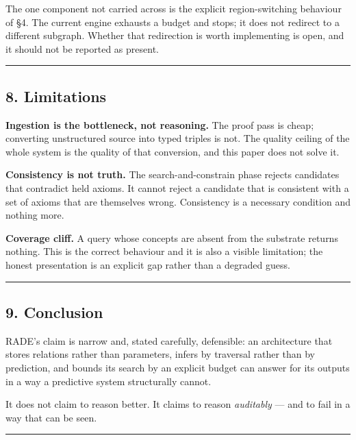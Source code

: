 \documentclass[
  11pt,
  a4paper,
]{article}
\begin{document}
The one component not carried across is the explicit region-switching
behaviour of §4. The current engine exhausts a budget and stops; it does
not redirect to a different subgraph. Whether that redirection is worth
implementing is open, and it should not be reported as present.

\begin{center}\rule{0.5\linewidth}{0.5pt}\end{center}

\subsection{8. Limitations}\label{limitations}

\textbf{Ingestion is the bottleneck, not reasoning.} The proof pass is
cheap; converting unstructured source into typed triples is not. The
quality ceiling of the whole system is the quality of that conversion,
and this paper does not solve it.

\textbf{Consistency is not truth.} The search-and-constrain phase
rejects candidates that contradict held axioms. It cannot reject a
candidate that is consistent with a set of axioms that are themselves
wrong. Consistency is a necessary condition and nothing more.

\textbf{Coverage cliff.} A query whose concepts are absent from the
substrate returns nothing. This is the correct behaviour and it is also
a visible limitation; the honest presentation is an explicit gap rather
than a degraded guess.

\begin{center}\rule{0.5\linewidth}{0.5pt}\end{center}

\subsection{9. Conclusion}\label{conclusion}

RADE's claim is narrow and, stated carefully, defensible: an
architecture that stores relations rather than parameters, infers by
traversal rather than by prediction, and bounds its search by an
explicit budget can answer for its outputs in a way a predictive system
structurally cannot.

It does not claim to reason better. It claims to reason \emph{auditably}
--- and to fail in a way that can be seen.

\begin{center}\rule{0.5\linewidth}{0.5pt}\end{center}
\end{document}

